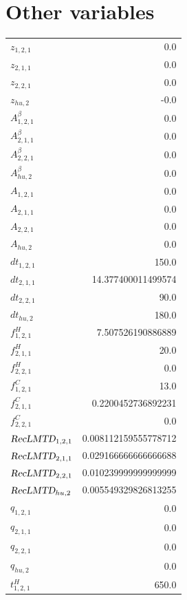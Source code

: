 \documentclass{article}%
\makeatletter
\let\mcnewpage=\newpage%
\newcommand{\TrickSupertabularIntoMulticols}{%
\renewcommand\newpage{%
\if@firstcolumn%
\hrule width\linewidth height0pt%
\columnbreak%
\else%
\mcnewpage%
\fi%
}%
}%
\makeatother
\begin{document}
\section{Other variables}%
\thispagestyle{plain}%
\begin{multicols*}{3}%
\TrickSupertabularIntoMulticols%
%
\begin{supertabular}{lr}%
	$z_{1,2,1}$ & 0.0 \\%
	$z_{2,1,1}$ & 0.0 \\%
	$z_{2,2,1}$ & 0.0 \\%
	$z_{hu,2}$ & -0.0 \\%
	$A_{1,2,1}^{\beta}$ & 0.0 \\%
	$A_{2,1,1}^{\beta}$ & 0.0 \\%
	$A_{2,2,1}^{\beta}$ & 0.0 \\%
	$A_{hu,2}^{\beta}$ & 0.0 \\%
	$A_{1,2,1}$ & 0.0 \\%
	$A_{2,1,1}$ & 0.0 \\%
	$A_{2,2,1}$ & 0.0 \\%
	$A_{hu,2}$ & 0.0 \\%
	$dt_{1,2,1}$ & 150.0 \\%
	$dt_{2,1,1}$ & 14.377400011499574 \\%
	$dt_{2,2,1}$ & 90.0 \\%
	$dt_{hu,2}$ & 180.0 \\%
	$f_{1,2,1}^{H}$ & 7.507526190886889 \\%
	$f_{2,1,1}^{H}$ & 20.0 \\%
	$f_{2,2,1}^{H}$ & 0.0 \\%
	$f_{1,2,1}^{C}$ & 13.0 \\%
	$f_{2,1,1}^{C}$ & 0.2200452736892231 \\%
	$f_{2,2,1}^{C}$ & 0.0 \\%
	$\textsl{RecLMTD}_{1,2,1}$ & 0.008112159555778712 \\%
	$\textsl{RecLMTD}_{2,1,1}$ & 0.029166666666666688 \\%
	$\textsl{RecLMTD}_{2,2,1}$ & 0.010239999999999999 \\%
	$\textsl{RecLMTD}_{hu,2}$ & 0.005549329826813255 \\%
	$q_{1,2,1}$ & 0.0 \\%
	$q_{2,1,1}$ & 0.0 \\%
	$q_{2,2,1}$ & 0.0 \\%
	$q_{hu,2}$ & 0.0 \\%
	$t_{1,2,1}^{H}$ & 650.0 \\%

\end{supertabular}
\end{multicols*}
\end{document}
